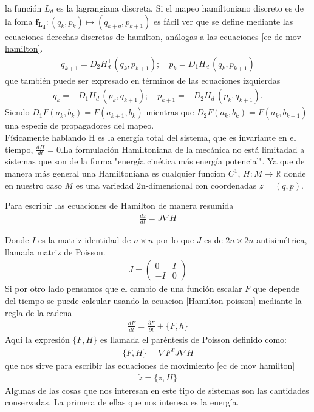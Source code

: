 la función $L_{d}$ es la lagrangiana discreta. Si el mapeo hamiltoniano discreto es de la foma $\mathbf{f_{L_{d}}}:(q_{k},p_{k})\mapsto(q_{k+q},p_{k+1})$ es fácil ver que se define mediante las ecuaciones derechas discretas de hamilton, análogas a las ecuaciones \ref{ec de mov hamilton}.
\begin{eqnarray}
q_{k+1}=D_{2}H_{d}^{+}(q_{k},p_{k+1}); \quad p_{k}=D_{1}H_{d}^{+}(q_{k},p_{k+1})
\label{ec de mov hamilton derechas}
\end{eqnarray}
que también puede ser expresado en términos de las ecuaciones izquierdas 
\begin{eqnarray}
q_{k}=-D_{1}H_{d}^{-}(p_{k},q_{k+1}); \quad p_{k+1}=-D_{2}H_{d}^{-}(p_{k},q_{k+1}).
\end{eqnarray}
Siendo $D_{1}F(a_{k},b_{k})=F(a_{k+1},b_{k})$ mientras que $D_{2}F(a_{k},b_{k})=F(a_{k},b_{k+1})$ una especie de propagadores del mapeo.\\


Físicamente hablando H es la energía total del sistema, que es invariante en el tiempo, $\frac{dH}{dt}=0$.La formulación Hamiltoniana de la mecánica no está limitadad a sistemas que son de la forma "energía cinética más energía potencial". Ya que de manera más general una Hamiltoniana es cualquier funcion $C^{1}$, $H:M\rightarrow \mathbb{R}$ donde en nuestro caso $M$ es una variedad 2n-dimensional con coordenadas  $z=(q,p)$. 



Para escribir las ecuaciones de Hamilton de manera resumida
\begin{eqnarray}
\frac{dz}{dt}=J\nabla H \label{Hamilton-poisson}
\end{eqnarray}

Donde $I$ es la matriz identidad de $n\times n$ por lo que $J$ es de $2n\times 2n$ antisimétrica, llamada matriz de Poisson. 
\begin{eqnarray*}
J=  \begin{pmatrix}
0 & I\\
-I & 0
\end{pmatrix}
\end{eqnarray*}
Si por otro lado pensamos que el cambio de una función escalar $F$ que depende del tiempo se puede calcular usando la ecuacion \ref{Hamilton-poisson} mediante la regla de la cadena 
\begin{eqnarray*}
\frac{dF}{dt}=\frac{\partial F}{\partial t}+ \lbrace F,h\rbrace
\end{eqnarray*}
Aquí la expresión $\lbrace F,H \rbrace$ es llamada el paréntesis de Poisson definido como:
\begin{eqnarray}
\lbrace F,H \rbrace=\nabla F^{T}J\nabla H \label{Parentesis Poisson}
\end{eqnarray}
que nos sirve para escribir las ecuaciones de movimiento \ref{ec de mov hamilton}
\begin{eqnarray}
\dot{z}=\lbrace z,H\rbrace \label{ec. de movimiento 2}
\end{eqnarray}
Algunas de las cosas que nos interesan en este tipo de sistemas son las cantidades conservadas. La primera de ellas que nos interesa es la energía.\\

